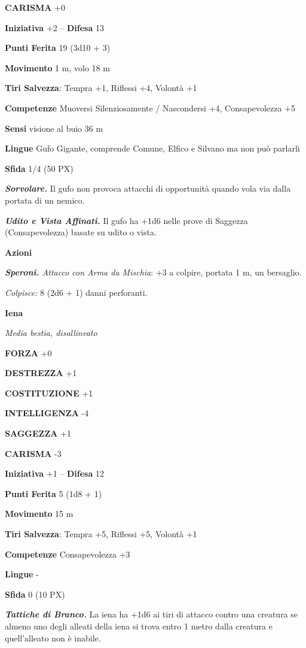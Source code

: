 \begin{multicols}{2}
	\textbf{CARISMA} +0

	\textbf{Iniziativa} +2 -- \textbf{Difesa} 13

	\textbf{Punti Ferita} 19 (3d10 + 3)

	\textbf{Movimento} 1 m, volo 18 m

	\textbf{Tiri Salvezza}: Tempra +1, Riflessi +4, Volontà +1

	\textbf{Competenze} Muoversi Silenziosamente / Nascondersi +4, Consapevolezza +5

	\textbf{Sensi} visione al buio 36 m

	\textbf{Lingue} Gufo Gigante, comprende Comune, Elfico e Silvano ma non può parlarli

	\textbf{Sfida} 1/4 (50 PX)

	\textit{\textbf{Sorvolare.}} Il gufo non provoca attacchi di opportunità quando vola via dalla portata di un nemico.

	\textit{\textbf{Udito e Vista Affinati.}} Il gufo ha +1d6 nelle prove di Saggezza (Consapevolezza) basate su udito o vista.

	\textbf{Azioni}

	\textit{\textbf{Speroni.} Attacco con Arma da Mischia}: +3 a colpire, portata 1 m, un bersaglio.

	\textit{Colpisce:} 8 (2d6 + 1) danni perforanti.

	\medskip\textbf{Iena}

	\textit{Media bestia, disallineato}

	\textbf{FORZA} +0

	\textbf{DESTREZZA} +1

	\textbf{COSTITUZIONE} +1

	\textbf{INTELLIGENZA} -4

	\textbf{SAGGEZZA} +1

	\textbf{CARISMA} -3

	\textbf{Iniziativa} +1 -- \textbf{Difesa} 12

	\textbf{Punti Ferita} 5 (1d8 + 1)

	\textbf{Movimento} 15 m

	\textbf{Tiri Salvezza}: Tempra +5, Riflessi +5, Volontà +1

	\textbf{Competenze} Consapevolezza +3

	\textbf{Lingue} -

	\textbf{Sfida} 0 (10 PX)

	\textit{\textbf{Tattiche di Branco.}} La iena ha +1d6 ai tiri di attacco contro una creatura se almeno uno degli alleati della iena si trova entro 1 metro dalla creatura e quell'alleato non è inabile.


\end{multicols}

